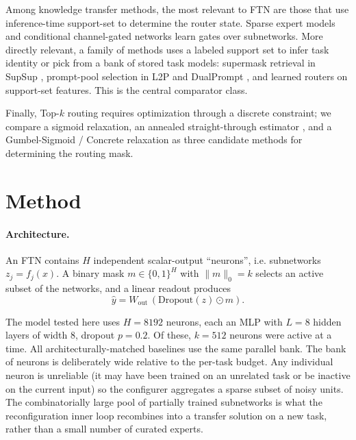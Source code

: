 \documentclass[11pt]{article}
\begin{document}
Among knowledge transfer methods, the most relevant to FTN are those that use inference-time support-set to determine the router state. Sparse expert models \citep{shazeer2017outrageously,fedus2022switch} and conditional channel-gated networks \citep{abati2020conditional} learn gates over subnetworks. More directly relevant, a family of methods uses a labeled support set to infer task identity or pick from a bank of stored task models: supermask retrieval in SupSup \citep{wortsman2020supermasks}, prompt-pool selection in L2P and DualPrompt \citep{wang2022learning,wang2022dualprompt}, and learned routers on support-set features. This is the central comparator class.

Finally, Top-$k$ routing requires optimization through a discrete constraint; we compare a sigmoid relaxation, an annealed straight-through estimator \citep{bengio2013estimating}, and a Gumbel-Sigmoid / Concrete relaxation \citep{jang2017categorical,maddison2017concrete} as three candidate methods for determining the routing mask.

\section{Method}\label{sec:method}

\paragraph{Architecture.}
An FTN contains $H$ independent scalar-output ``neurons'', i.e. subnetworks $z_j=f_j(x)$. A binary mask $m\in\{0,1\}^H$ with $\|m\|_0=k$ selects an active subset of the networks, and a linear readout produces
\[
  \hat{y} = W_\mathrm{out}\,(\mathrm{Dropout}(z)\odot m).
\]

The model tested here uses $H=8192$ neurons, each an MLP with $L=8$ hidden layers of width $8$, dropout $p=0.2$. Of these, $k=512$ neurons were active at a time. All architecturally-matched baselines use the same parallel bank. The bank of neurons is deliberately wide relative to the per-task budget. Any individual neuron is unreliable (it may have been trained on an unrelated task or be inactive on the current input) so the configurer aggregates a sparse subset of noisy units. The combinatorially large pool of partially trained subnetworks is what the reconfiguration inner loop recombines into a transfer solution on a new task, rather than a small number of curated experts.
\end{document}
